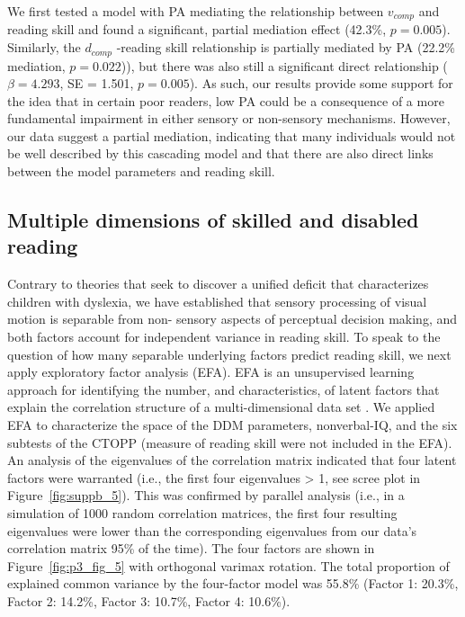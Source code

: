 \documentclass[../uwthesis.tex]{subfiles}
\begin{document}
We first tested a model with PA mediating the relationship between $v_{comp}$ and reading skill and found a significant, partial mediation effect (42.3\%, $p = 0.005$). Similarly, the $d_{comp}$ -reading skill relationship is partially mediated by PA (22.2\% mediation, $p = 0.022$)), but there was also
still a significant direct relationship ($\beta = 4.293$, SE = 1.501, $p = 0.005$). As such, our results provide some support for the idea that in certain poor readers, low PA could be a consequence of a more fundamental impairment in either sensory or non-sensory mechanisms. However, our data
suggest a partial mediation, indicating that many individuals would not be well described by this cascading model and that there are also direct links between the model parameters and reading skill.

\subsection{Multiple dimensions of skilled and disabled reading}

Contrary to theories that seek to discover a unified deficit that characterizes children with
dyslexia, we have established that sensory processing of visual motion is separable from non-
sensory aspects of perceptual decision making, and both factors account for independent variance
in reading skill. To speak to the question of how many separable underlying factors predict reading
skill, we next apply exploratory factor analysis (EFA). EFA is an unsupervised learning approach
for identifying the number, and characteristics, of latent factors that explain the correlation
structure of a multi-dimensional data set \citep{Ferguson1993ExploratoryUsersGuide,Costello2005BestAnalysis,Kline2013ExploratoryAnalysis}. We applied EFA to characterize the space of the DDM parameters, nonverbal-IQ, and the six subtests of the CTOPP (measure of reading skill were not included in the EFA). An analysis of the eigenvalues of the correlation matrix indicated that
four latent factors were warranted (i.e., the first four eigenvalues > 1, see scree plot in Figure~\ref{fig:suppb_5}).
This was confirmed by parallel analysis \citep{Hayton2004FactorAnalysis} (i.e., in a simulation of 1000 random correlation matrices, the first four resulting eigenvalues were lower than the corresponding eigenvalues from
our data’s correlation matrix 95\% of the time). The four factors are shown in Figure~\ref{fig:p3_fig_5} with
orthogonal varimax rotation. The total proportion of explained common variance by the four-factor
model was 55.8\% (Factor 1: 20.3\%, Factor 2: 14.2\%, Factor 3: 10.7\%, Factor 4: 10.6\%).
\end{document}
